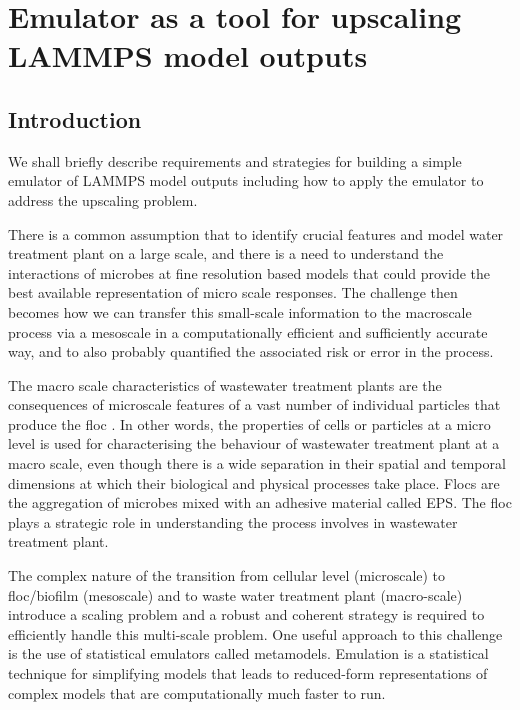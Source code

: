 \documentclass[12pt,titlepage]{report}
\theoremstyle{definition}
\theoremstyle{remark}
\begin{document}
\chapter{Emulator as a tool for upscaling LAMMPS model outputs}

\section{Introduction}
We shall briefly describe requirements and strategies for building a simple emulator of LAMMPS model outputs including how to apply the emulator to address the upscaling problem. 

There is a common assumption that to identify crucial features and model water treatment plant on a large scale, and there is a need to understand the interactions of microbes at fine resolution based models that could provide the best available representation of micro scale responses. The challenge then becomes how we can transfer this small-scale information to the macroscale process via a mesoscale in a computationally efficient and sufficiently accurate way, and to also probably quantified the associated risk or error in the process.

The macro scale characteristics of wastewater treatment plants are the consequences of microscale features of a vast number of individual particles that produce the floc \citep{l11}. In other words, the properties of cells or particles at a micro level is used for characterising the behaviour of wastewater treatment plant at a macro scale, even though there is a wide separation in their spatial and temporal dimensions at which their biological and physical processes take place. Flocs are the aggregation of microbes mixed with an adhesive material called EPS. The floc plays a strategic role in understanding the process involves in wastewater treatment plant. 

The complex nature of the transition from cellular level (microscale) to floc/biofilm (mesoscale) and to waste water treatment plant (macro-scale) introduce a scaling problem and a robust and coherent strategy is required to efficiently handle this multi-scale problem.
One useful approach to this challenge is the use of statistical emulators called metamodels. Emulation is a statistical technique for simplifying models that leads to reduced-form representations of complex models that are computationally much faster to run.
\end{document}
